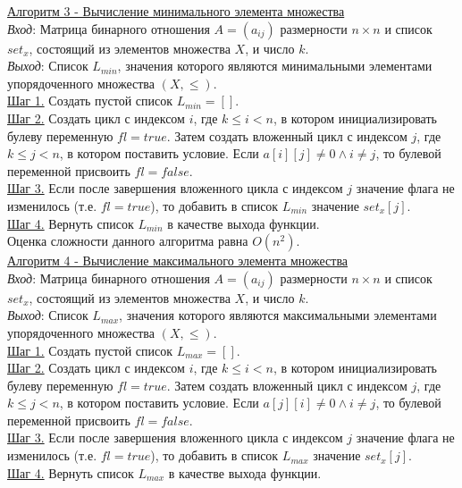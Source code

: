 \documentclass[bachelor, och, labwork]{shiza}
\begin{document}
        \underline{Алгоритм 3 - Вычисление минимального элемента множества} \\
            \textit{Вход}: Матрица бинарного отношения $A = (a_{ij})$ размерности $n \times n$ и список $set_x$, состоящий из элементов
            множества $X$, и  число $k$.\\            
            \textit{Выход}: Список $L_{min}$, значения которого являются минимальными элементами упорядоченного множества $(X, \leq)$.\\
            \underline{Шаг 1.} Создать пустой список $L_{min} = []$.\\
            \underline{Шаг 2.} Создать цикл с индексом $i$, где $k \leq i < n$, в котором инициализировать булеву переменную $fl = true$.
            Затем создать вложенный цикл с индексом $j$, где $k \leq j < n$, в котором поставить условие. Если $a[i][j] \neq 0 \wedge i \neq j$,
            то булевой переменной присвоить $fl = false$. \\
            \underline{Шаг 3.} Если после завершения вложенного цикла с индексом $j$ значение флага не изменилось (т.е. $fl = true$), то
            добавить в список $L_{min}$ значение $set_x[j]$.\\
            \underline{Шаг 4.} Вернуть список $L_{min}$ в качестве выхода функции.\\

            Оценка сложности данного алгоритма равна $O(n^2)$.\\

        \underline{Алгоритм 4 - Вычисление максимального элемента множества}\\
            \textit{Вход}: Матрица бинарного отношения $A = (a_{ij})$ размерности $n \times n$ и список $set_x$, состоящий из элементов
            множества $X$, и число $k$.\\            
            \textit{Выход}: Список $L_{max}$, значения которого являются максимальными элементами упорядоченного множества $(X, \leq)$.\\
            \underline{Шаг 1.} Создать пустой список $L_{max} = []$.\\
            \underline{Шаг 2.} Создать цикл с индексом $i$, где $k \leq i < n$, в котором инициализировать булеву переменную $fl = true$.
            Затем создать вложенный цикл с индексом $j$, где $k \leq j < n$, в котором поставить условие. Если $a[j][i] \neq 0 \wedge i \neq j$,
            то булевой переменной присвоить $fl = false$. \\
            \underline{Шаг 3.} Если после завершения вложенного цикла с индексом $j$ значение флага не изменилось (т.е. $fl = true$), то
            добавить в список $L_{max}$ значение $set_x[j]$.\\
            \underline{Шаг 4.} Вернуть список $L_{max}$ в качестве выхода функции.\\
\end{document}
